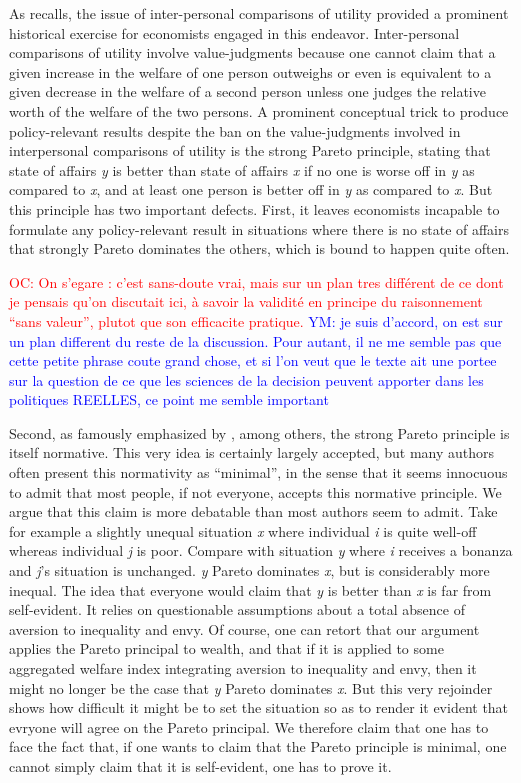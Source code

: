 \documentclass[preprint, french, english, 11pt]{elsarticle}%
\newcommand{\commentYM}[1]{\textcolor{blue}{YM: #1}}
\newcommand{\commentOC}[1]{\textcolor{red}{OC: #1}}
\begin{document}
As \cite{baujard_leconomie_2011} recalls, the issue of inter-personal comparisons of utility provided a prominent historical exercise for economists engaged in this endeavor. Inter-personal comparisons of utility involve value-judgments because one cannot claim that a given increase in the welfare of one person outweighs or even is equivalent to a given decrease in the welfare of a second person unless one judges the relative worth of the welfare of the two persons. A prominent conceptual trick to produce policy-relevant results despite the ban on the value-judgments involved in interpersonal comparisons of utility is the strong Pareto principle, stating that state of affairs \emph{y} is better than state of affairs \emph{x} if no one is worse off in \emph{y} as compared to \emph{x}, and at least one person is better off in \emph{y} as compared to \emph{x}. But this principle has two important defects. First, it leaves economists incapable to formulate any policy-relevant result in situations where there is no state of affairs that strongly Pareto dominates the others, which is bound to happen quite often. 

\commentOC{ On s'egare : c'est sans-doute vrai,
mais sur un plan tres différent de ce dont je pensais qu'on
discutait ici, à savoir la validité en principe du raisonnement
``sans valeur'', plutot que son efficacite pratique.}
\commentYM{je suis d'accord, on est sur un plan different du reste de la discussion. Pour autant, il ne me semble pas que cette petite phrase coute grand chose, et si l'on veut que le texte ait une portee sur la question de ce que les sciences de la decision peuvent apporter dans les politiques REELLES, ce point me semble important}

Second, as famously emphasized by \cite{sen_rationality_2004}, among others, the strong Pareto principle is itself normative. This very idea is certainly largely accepted, but many authors often present this normativity as ``minimal'', in the sense that it seems innocuous to admit that most people, if not everyone, accepts this normative principle. We argue that this claim is more debatable than most authors seem to admit. Take for example a slightly unequal situation \emph{x} where individual \emph{i} is quite well-off whereas individual \emph{j} is poor. Compare with situation \emph{y} where \emph{i} receives a bonanza and \emph{j}'s situation is unchanged. \emph{y} Pareto dominates \emph{x}, but is considerably more inequal. The idea that everyone would claim that \emph{y} is better than \emph{x} is far from self-evident. It relies on questionable assumptions about a total absence of aversion to inequality and envy. Of course, one can retort that our argument applies the Pareto principal to wealth, and that if it is applied to some aggregated welfare index integrating aversion to inequality and envy, then it might no longer be the case that \emph{y} Pareto dominates \emph{x}. But this very rejoinder shows how difficult it might be to set the situation so as to render it evident that evryone will agree on the Pareto principal. We therefore claim that one has to face the fact that, if one wants to claim that the Pareto principle is minimal, one cannot simply claim that it is self-evident, one has to prove it.
\end{document}
